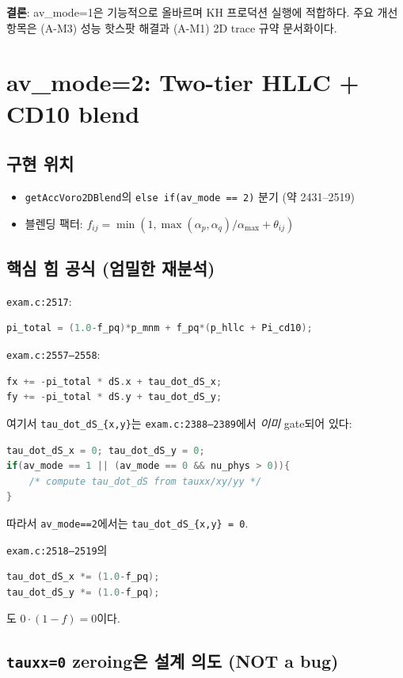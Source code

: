 \documentclass[11pt]{article}
\begin{document}
\textbf{결론}: av\_mode=1은 기능적으로 올바르며 KH 프로덕션 실행에 적합하다.
주요 개선 항목은 (A-M3) 성능 핫스팟 해결과 (A-M1) 2D trace 규약 문서화이다.


\section{av\_mode=2: Two-tier HLLC + CD10 blend}
\label{sec:av2rationale}

\subsection{구현 위치}
\begin{itemize}
  \item \texttt{getAccVoro2DBlend}의 \texttt{else if(av\_mode == 2)} 분기 (약 2431--2519)
  \item 블렌딩 팩터: $f_{ij} = \min(1, \max(\alpha_p,\alpha_q)/\alpha_\mathrm{max} + \theta_{ij})$
\end{itemize}

\subsection{핵심 힘 공식 (엄밀한 재분석)}

\texttt{exam.c:2517}:
\begin{lstlisting}[language=C]
pi_total = (1.0-f_pq)*p_mnm + f_pq*(p_hllc + Pi_cd10);
\end{lstlisting}
\texttt{exam.c:2557--2558}:
\begin{lstlisting}[language=C]
fx += -pi_total * dS.x + tau_dot_dS_x;
fy += -pi_total * dS.y + tau_dot_dS_y;
\end{lstlisting}

여기서 \texttt{tau\_dot\_dS\_\{x,y\}}는 \texttt{exam.c:2388--2389}에서
\emph{이미} gate되어 있다:
\begin{lstlisting}[language=C]
tau_dot_dS_x = 0; tau_dot_dS_y = 0;
if(av_mode == 1 || (av_mode == 0 && nu_phys > 0)){
    /* compute tau_dot_dS from tauxx/xy/yy */
}
\end{lstlisting}
따라서 \texttt{av\_mode==2}에서는 \texttt{tau\_dot\_dS\_\{x,y\} = 0}.

\texttt{exam.c:2518--2519}의
\begin{lstlisting}[language=C]
tau_dot_dS_x *= (1.0-f_pq);
tau_dot_dS_y *= (1.0-f_pq);
\end{lstlisting}
도 $0\cdot(1-f) = 0$이다.

\subsection{\texttt{tauxx=0} zeroing은 설계 의도 (NOT a bug)}
\end{document}
